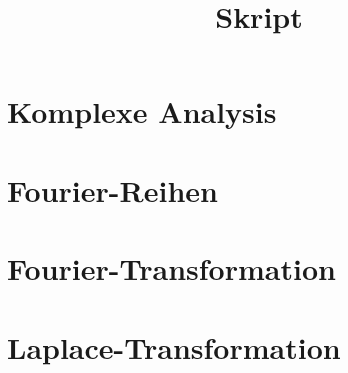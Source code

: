 \documentclass[a4paper]{article}
\author{\pProfessor}
\title{Skript\\\pTitle}
\begin{document}
\maketitle
\newpage
\tableofcontents
\newpage
\listoffigures

\theoremstyle{definition}
\newtheorem{satz}{Satz}[section] 
\newtheorem{definition}{Definition}[section] 
\newtheorem{lemma}{Lemma}[section] 
\newtheorem{behauptung}{Behauptung}[section] 
\newtheorem{beispiel}{Beispiel}
\newenvironment{beweis}{\begin{proof}}{\end{proof}} %

\part{Komplexe Analysis}












\part{Fourier-Reihen}





\part{Fourier-Transformation}





\part{Laplace-Transformation}







\end{document}

